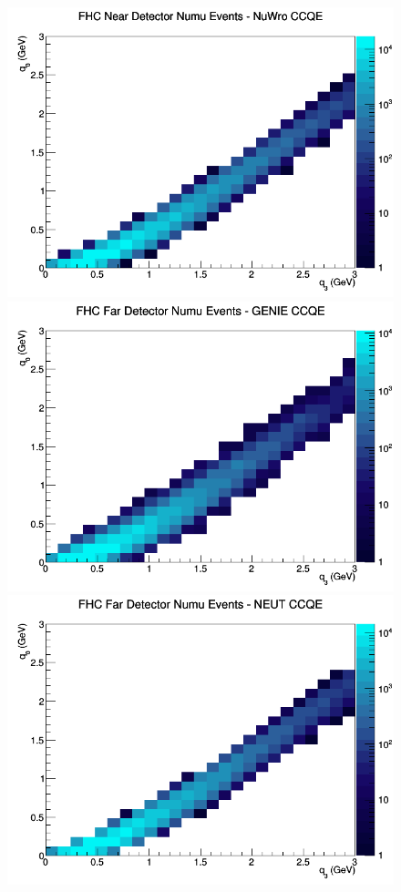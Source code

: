 \begin{figure}[h]
\endminipage
{}
\includegraphics[width=\linewidth]{q0_q3/nominal/CCQE_FHC_ND_numu_q3_q0_NuWro.png}
\endminipage
\newline
{}
\includegraphics[width=\linewidth]{q0_q3/nominal/CCQE_FHC_FD_numu_q3_q0_GENIE.png}
\endminipage
{}
\includegraphics[width=\linewidth]{q0_q3/nominal/CCQE_FHC_FD_numu_q3_q0_NEUT.png}

\end{figure}
